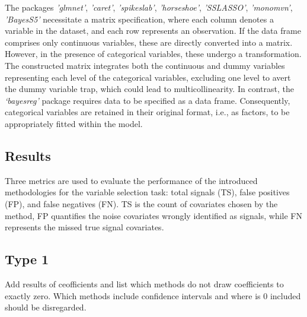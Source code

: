 \documentclass[
  11pt,
]{article}
\begin{document}
The packages \emph{'glmnet'}, \emph{'caret'}, \emph{'spikeslab'},
\emph{'horseshoe'}, \emph{'SSLASSO'}, \emph{'monomvn'}, \emph{'BayesS5'}
necessitate a matrix specification, where each column denotes a variable
in the dataset, and each row represents an observation. If the data
frame comprises only continuous variables, these are directly converted
into a matrix. However, in the presence of categorical variables, these
undergo a transformation. The constructed matrix integrates both the
continuous and dummy variables representing each level of the
categorical variables, excluding one level to avert the dummy variable
trap, which could lead to multicollinearity. In contrast, the
\emph{`bayesreg'} package requires data to be specified as a data frame.
Consequently, categorical variables are retained in their original
format, i.e., as factors, to be appropriately fitted within the model.

\subsection{Results}

Three metrics are used to evaluate the performance of the introduced
methodologies for the variable selection task: total signals (TS), false
positives (FP), and false negatives (FN). TS is the count of covariates
chosen by the method, FP quantifies the noise covariates wrongly
identified as signals, while FN represents the missed true signal
covariates.

\subsection{Type 1}

Add results of ceofficients and list which methods do not draw
coefficients to exactly zero. Which methods include confidence intervals
and where is 0 included should be disregarded.
\end{document}
